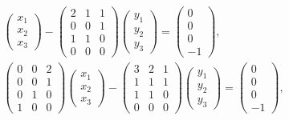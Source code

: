 \documentclass[12pt]{article}
\begin{document}
\begin{gather*}
\begin{pmatrix}
            x_1 \\ x_2 \\ x_3
        \end{pmatrix}
        -
        \begin{pmatrix}
            2 & 1 & 1 \\
            0 & 0 & 1 \\
            1 & 1 & 0 \\
            0 & 0 & 0
        \end{pmatrix}
        \begin{pmatrix}
            y_1 \\ y_2 \\ y_3
        \end{pmatrix}
        =
        \begin{pmatrix}
            0 \\
            0 \\
            0 \\
            -1
        \end{pmatrix} , \\
        \begin{pmatrix}
            0 & 0 & 2 \\
            0 & 0 & 1 \\
            0 & 1 & 0 \\
            1 & 0 & 0
        \end{pmatrix}
        \begin{pmatrix}
            x_1 \\ x_2 \\ x_3
        \end{pmatrix}
        -
        \begin{pmatrix}
            3 & 2 & 1 \\
            1 & 1 & 1 \\
            1 & 1 & 0 \\
            0 & 0 & 0
        \end{pmatrix}
        \begin{pmatrix}
            y_1 \\ y_2 \\ y_3
        \end{pmatrix}
        =
        \begin{pmatrix}
            0 \\
            0 \\
            0 \\
            -1
        \end{pmatrix} ,
    \end{gather*}
\end{document}
